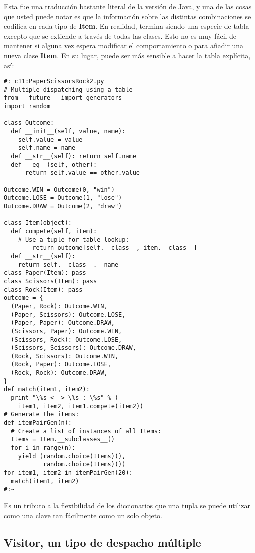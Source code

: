 Esta fue una traducción bastante literal de la versión de Java, y una de las cosas que usted puede notar es que la información sobre las distintas combinaciones se codifica en cada tipo de \textbf{Item}. En realidad, termina siendo una especie de tabla excepto que se extiende a través de todas las clases. Esto no es muy fácil de mantener si alguna vez espera modificar el comportamiento o para añadir una nueva clase \textbf{Item}. En su lugar, puede ser más sensible a hacer la tabla explícita, así:  \newline

\begin{lstlisting} 
#: c11:PaperScissorsRock2.py 
# Multiple dispatching using a table 
from __future__ import generators 
import random 

class Outcome: 
  def __init__(self, value, name):  
    self.value = value 
    self.name = name 
  def __str__(self): return self.name  
  def __eq__(self, other): 
      return self.value == other.value 
      
Outcome.WIN = Outcome(0, "win") 
Outcome.LOSE = Outcome(1, "lose") 
Outcome.DRAW = Outcome(2, "draw") 

class Item(object): 
  def compete(self, item): 
    # Use a tuple for table lookup: 
        return outcome[self.__class__, item.__class__] 
  def __str__(self):  
    return self.__class__.__name__  
class Paper(Item): pass 
class Scissors(Item): pass 
class Rock(Item): pass 
outcome = { 
  (Paper, Rock): Outcome.WIN, 
  (Paper, Scissors): Outcome.LOSE, 
  (Paper, Paper): Outcome.DRAW, 
  (Scissors, Paper): Outcome.WIN, 
  (Scissors, Rock): Outcome.LOSE, 
  (Scissors, Scissors): Outcome.DRAW, 
  (Rock, Scissors): Outcome.WIN, 
  (Rock, Paper): Outcome.LOSE, 
  (Rock, Rock): Outcome.DRAW, 
} 
def match(item1, item2): 
  print "\%s <--> \%s : \%s" % ( 
    item1, item2, item1.compete(item2)) 
# Generate the items: 
def itemPairGen(n): 
  # Create a list of instances of all Items: 
  Items = Item.__subclasses__() 
  for i in range(n): 
    yield (random.choice(Items)(),  
           random.choice(Items)()) 
for item1, item2 in itemPairGen(20): 
  match(item1, item2) 
#:~ 
\end{lstlisting}

Es un tributo a la flexibilidad de los diccionarios que una tupla se puede utilizar como una clave tan fácilmente como un solo objeto. \newpage


\subsection*{Visitor, un tipo de despacho múltiple}
\label{subsec:vutddm}


